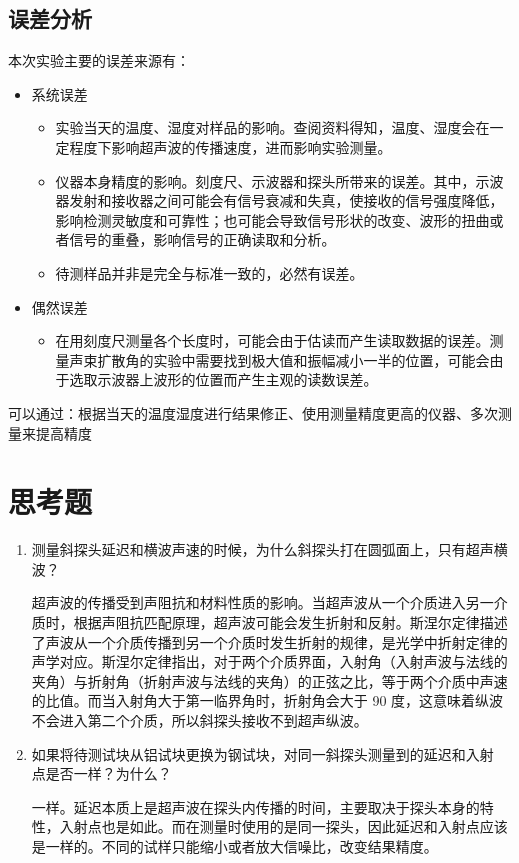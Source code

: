 \documentclass[a4paper,utf8]{article}
\begin{document}
    \subsection{误差分析}
        本次实验主要的误差来源有：
        \begin{itemize}
            \item 系统误差
                \begin{itemize}
                    \item 实验当天的温度、湿度对样品的影响。查阅资料得知，温度、湿度会在一定程度下影响超声波的传播速度，进而影响实验测量。
                    \item 仪器本身精度的影响。刻度尺、示波器和探头所带来的误差。其中，示波器发射和接收器之间可能会有信号衰减和失真，使接收的信号强度降低，影响检测灵敏度和可靠性；也可能会导致信号形状的改变、波形的扭曲或者信号的重叠，影响信号的正确读取和分析。
                    \item 待测样品并非是完全与标准一致的，必然有误差。
                \end{itemize}
            \item 偶然误差
                \begin{itemize}
                    \item 在用刻度尺测量各个长度时，可能会由于估读而产生读取数据的误差。测量声束扩散角的实验中需要找到极大值和振幅减小一半的位置，可能会由于选取示波器上波形的位置而产生主观的读数误差。
                \end{itemize}
        \end{itemize}
        可以通过：根据当天的温度湿度进行结果修正、使用测量精度更高的仪器、多次测量来提高精度
\section{思考题}
    \begin{enumerate}
        \item 测量斜探头延迟和横波声速的时候，为什么斜探头打在圆弧面上，只有超声横波？\par
        超声波的传播受到声阻抗和材料性质的影响。当超声波从一个介质进入另一介质时，根据声阻抗匹配原理，超声波可能会发生折射和反射。斯涅尔定律描述了声波从一个介质传播到另一个介质时发生折射的规律，是光学中折射定律的声学对应。斯涅尔定律指出，对于两个介质界面，入射角（入射声波与法线的夹角）与折射角（折射声波与法线的夹角）的正弦之比，等于两个介质中声速的比值。而当入射角大于第一临界角时，折射角会大于 90 度，这意味着纵波不会进入第二个介质，所以斜探头接收不到超声纵波。
        
        \item 如果将待测试块从铝试块更换为钢试块，对同一斜探头测量到的延迟和入射
        点是否一样？为什么？\par
        一样。延迟本质上是超声波在探头内传播的时间，主要取决于探头本身的特性，入射点也是如此。而在测量时使用的是同一探头，因此延迟和入射点应该是一样的。不同的试样只能缩小或者放大信噪比，改变结果精度。
    \end{enumerate}    
\end{document}
